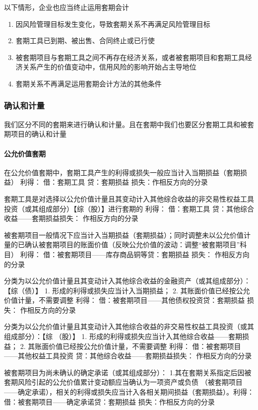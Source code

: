 \documentclass[UTF8,12pt]{ctexart}
\numberwithin{equation}{section} %
\numberwithin{figure}{section}
\numberwithin{table}{section}
\begin{document}
	以下情形，企业也应当终止运用套期会计
	\begin{enumerate}
		\item 因风险管理目标发生变化，导致套期关系不再满足风险管理目标
		
		\item 套期工具已到期、被出售、合同终止或已行使
		
		\item 被套期项目与套期工具之间不再存在经济关系，或者被套期项目和套期工具经济关系产生的价值变动中，信用风险的影响开始占主导地位
		
		\item 套期关系不再满足运用套期会计方法的其他条件
	\end{enumerate}
	
	\subsubsection{确认和计量}
	我们区分不同的套期来进行确认和计量。且在套期中我们也要区分套期工具和被套期项目的确认和计量
	
	\paragraph{公允价值套期}在公允价值套期中，套期工具产生的利得或损失一般应当计入当期损益（套期损益）
	利得：
	借：套期工具 贷：套期损益
	损失：作相反方向的分录
	
	套期工具是对选择以公允价值计量且其变动计入其他综合收益的非交易性权益工具投资（或其组成部分）【综（股）】进行套期的
	利得：
	借：套期工具
	贷：其他综合收益——套期损益损失：
	作相反方向的分录
	
	被套期项目一般情况下应当计入当期损益（套期损益）；同时调整未以公允价值计量的已确认被套期项目的账面价值（反映公允价值的波动：调整“被套期项目”科目）
	利得：
	借：被套期项目——库存商品铜等贷：套期损益
	损失：
	作相反方向的分录
	
	分类为以公允价值计量且其变动计入其他综合收益的金融资产（或其组成部分）：【综（债）】
	1.	形成的利得或损失应当计入当期损益；
	2.	其账面价值已经按公允价值计量，不需要调整
	利得：
	借：被套期项目——其他债权投资贷：套期损益
	损失：
	作相反方向的分录
	
	分类为以公允价值计量且其变动计入其他综合收益的非交易性权益工具投资（或其组成部分）：【综
	（股）】
	1.	形成的利得或损失应当计入其他综合收益——套期损益；
	2.	其账面价值已经按公允价值计量，不需要调整
	利得：
	借：被套期项目——其他权益工具投资
	贷：其他综合收益——套期损益损失：
	作相反方向的分录
	
	被套期项目为尚未确认的确定承诺（或其组成部分）：
	1.其在套期关系指定后因被套期风险引起的公允价值累计变动额应当确认为一项资产或负债
	（被套期项目——确定承诺），相关的利得或损失应当计入各相关期间损益（套期损益）。利得：
	借：被套期项目——确定承诺贷：套期损益
	损失：作相反方向的分录
	
\end{document}
